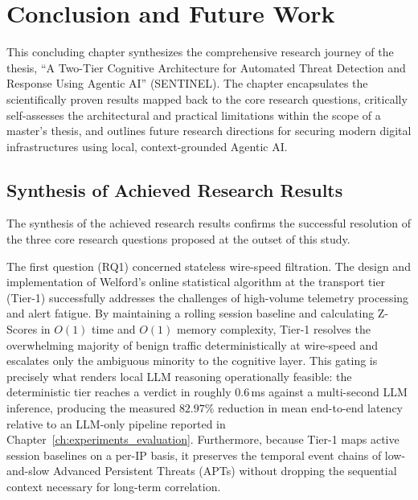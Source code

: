 \chapter{Conclusion and Future Work}
\label{ch:conclusion}

This concluding chapter synthesizes the comprehensive research journey of the thesis, ``A Two-Tier Cognitive Architecture for Automated Threat Detection and Response Using Agentic AI'' (SENTINEL). The chapter encapsulates the scientifically proven results mapped back to the core research questions, critically self-assesses the architectural and practical limitations within the scope of a master's thesis, and outlines future research directions for securing modern digital infrastructures using local, context-grounded Agentic AI.

\section{Synthesis of Achieved Research Results}
The synthesis of the achieved research results confirms the successful resolution of the three core research questions proposed at the outset of this study.

The first question (RQ1) concerned stateless wire-speed filtration. The design and implementation of Welford's online statistical algorithm at the transport tier (Tier-1) successfully addresses the challenges of high-volume telemetry processing and alert fatigue. By maintaining a rolling session baseline and calculating Z-Scores in $O(1)$ time and $O(1)$ memory complexity, Tier-1 resolves the overwhelming majority of benign traffic deterministically at wire-speed and escalates only the ambiguous minority to the cognitive layer. This gating is precisely what renders local LLM reasoning operationally feasible: the deterministic tier reaches a verdict in roughly $0.6$\,ms against a multi-second LLM inference, producing the measured $82.97\%$ reduction in mean end-to-end latency relative to an LLM-only pipeline reported in Chapter~\ref{ch:experiments_evaluation}. Furthermore, because Tier-1 maps active session baselines on a per-IP basis, it preserves the temporal event chains of low-and-slow Advanced Persistent Threats (APTs) without dropping the sequential context necessary for long-term correlation.

